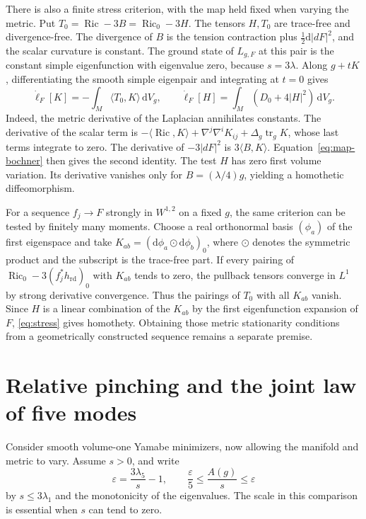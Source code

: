 \documentclass[11pt]{article}
\numberwithin{equation}{section}
\DeclareMathOperator{\Ric}{Ric}
\DeclareMathOperator{\tr}{tr}
\newcommand{\rd}{\mathrm{rd}}
\newcommand{\dd}{\mathrm{d}}
\newcommand{\e}{\varepsilon}
\newcommand{\ip}[2]{\langle #1,#2\rangle}
\newcommand{\abs}[1]{\lvert #1\rvert}
\newcommand{\dv}{\dd V_g}
\begin{document}
There is also a finite stress criterion, with the map held fixed
when varying the metric. Put \(T_0=\Ric-3B=\Ric_0-3H\).
The tensors \(H,T_0\) are trace-free and divergence-free.
The divergence of \(B\) is the tension contraction plus
\(\tfrac12\dd\abs{dF}^2\), and the scalar curvature is constant.
The ground state of \(L_{g,F}\) at this pair is the constant
simple eigenfunction with eigenvalue zero, because \(s=3\lambda\).
Along \(g+tK\), differentiating the smooth simple eigenpair
and integrating at \(t=0\) gives
\begin{equation}\label{eq:stress}
 \dot\ell_F[K]=-\int_M\ip{T_0}{K}\,\dv,\qquad
 \dot\ell_F[H]=\int_M(D_0+4\abs H^2)\,\dv .
\end{equation}
Indeed, the metric derivative of the Laplacian annihilates
constants. The derivative of the scalar term is
\(-\ip{\Ric}{K}+\nabla^j\nabla^i K_{ij}+
\Delta_g\tr_g K\), whose last terms integrate to zero.
The derivative of \(-3\abs{dF}^2\) is \(3\ip{B}{K}\).
Equation~\eqref{eq:map-bochner} then gives the second identity.
The test \(H\) has zero first volume variation. Its derivative
vanishes only for \(B=(\lambda/4)g\), yielding a homothetic
diffeomorphism.

For a sequence \(f_j\to F\) strongly in \(W^{1,2}\) on a fixed
\(g\), the same criterion can be tested by finitely many moments.
Choose a real orthonormal basis \((\phi_a)\) of the first
eigenspace and take
\(K_{ab}=(\dd\phi_a\odot\dd\phi_b)_0\), where
\(\odot\) denotes the symmetric product and the subscript is
the trace-free part. If every pairing of
\(\Ric_0-3(f_j^*h_{\rd})_0\) with \(K_{ab}\) tends to zero,
the pullback tensors converge in \(L^1\) by strong derivative
convergence. Thus the pairings of \(T_0\) with all \(K_{ab}\)
vanish. Since \(H\) is a linear combination of the \(K_{ab}\)
by the first eigenfunction expansion of \(F\),
\eqref{eq:stress} gives homothety. Obtaining those metric
stationarity conditions from a geometrically constructed
sequence remains a separate premise.

\section{Relative pinching and the joint law of five modes}
\label{sec:near}

Consider smooth volume-one Yamabe minimizers, now allowing the
manifold and metric to vary. Assume \(s>0\), and write
\[
 \e=\frac{3\lambda_5}{s}-1,\qquad
 \frac{\e}{5}\le \frac{A(g)}{s}\le\e
\]
by \(s\le3\lambda_1\) and the monotonicity of the eigenvalues.
The scale in this comparison is essential when \(s\) can tend to
zero.
\end{document}
